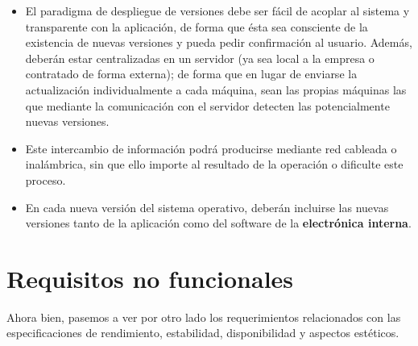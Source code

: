 \begin{itemize}
	\item El paradigma de despliegue de versiones debe ser fácil de acoplar al sistema y transparente con la aplicación, de forma que ésta sea consciente de la existencia de nuevas versiones y pueda pedir confirmación al usuario. Además, deberán estar centralizadas en un servidor (ya sea local a la empresa o contratado de forma externa); de forma que en lugar de enviarse la actualización individualmente a cada máquina, sean las propias máquinas las que mediante la comunicación con el servidor detecten las potencialmente nuevas versiones.
	\item Este intercambio de información podrá producirse mediante red cableada o inalámbrica, sin que ello importe al resultado de la operación o dificulte este proceso.
	\item En cada nueva versión del sistema operativo, deberán incluirse las nuevas versiones tanto de la aplicación como del software de la \textbf{electrónica interna}.
\end{itemize}

\section{Requisitos no funcionales}

Ahora bien, pasemos a ver por otro lado los requerimientos relacionados con las especificaciones de rendimiento, estabilidad, disponibilidad y aspectos estéticos.

